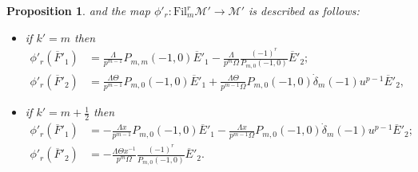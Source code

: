 \documentclass[11pt]{amsart}
\theoremstyle{definition}
\numberwithin{equation}{subsection}
\theoremstyle{plain}
\theoremstyle{plain}
\theoremstyle{plain}
\theoremstyle{plain}
\theoremstyle{plain}
\theoremstyle{plain}
\theoremstyle{plain}
\theoremstyle{plain}
\newtheorem{prop}[equation]{Proposition}
\theoremstyle{plain}
\theoremstyle{plain}
\theoremstyle{plain}
\theoremstyle{plain}
\theoremstyle{definition}
\theoremstyle{definition}
\theoremstyle{definition}
\theoremstyle{remark}
\renewcommand{\(}{\textup{(}}
\renewcommand{\)}{\textup{)}}
\newcommand{\cM}{\mathcal{M}}
\newcommand{\Fil}{\mathrm{Fil}}
\newcommand{\barE}{\overline{E}}
\newcommand{\barF}{\overline{F}}
\begin{document}
\begin{prop}
and the map $\phi'_r:\Fil^r_{m}\cM'\to \cM'$ is described as follows:
\begin{itemize}[leftmargin=*]
\item if $k'=m$ then
    \begin{align*}
    \phi'_r(\barF'_1) &=\frac{\Lambda}{p^{m-1}} P_{m,m}(-1,0)\barE'_1 -\frac{\Lambda}{p^m\Omega} \frac{(-1)^r}{P_{m,0}(-1,0)}\barE'_2;  \\
    \phi'_r(\barF'_2)  &= \frac{\Lambda \Theta}{p^{m-1}} P_{m,0}(-1,0)\barE'_1 + \frac{\Lambda\Theta}{p^{m-1}\Omega} P_{m,0}(-1,0)\dot{\delta}_m(-1)u^{p-1}\barE'_2,
    \end{align*}
\item if $k'=m+\frac{1}{2}$ then
    \begin{align*}
    \phi'_r(\barF'_1) &= -\frac{\Lambda x}{p^{m-1}} P_{m,0}(-1,0)\barE'_1 -\frac{\Lambda x}{p^{m-1}\Omega} P_{m,0}(-1,0)\dot{\delta}_m(-1)u^{p-1}\barE'_2; \\
    \phi'_r(\barF'_2) &= -\frac{\Lambda\Theta x^{-1}}{p^m\Omega} \frac{(-1)^r}{P_{m,0}(-1,0)}\barE'_2.
    \end{align*}
\end{itemize}
\end{prop}
\end{document}
